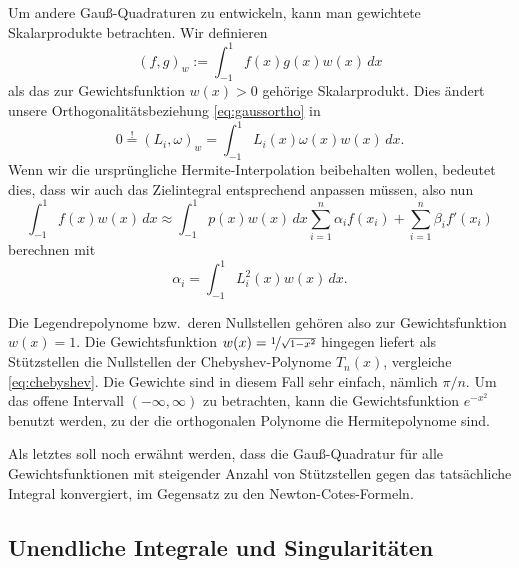 Um andere Gauß-Quadraturen zu entwickeln, kann man gewichtete
Skalarprodukte betrachten. Wir definieren
\begin{equation}
  (f,g)_w := \int_{-1}^1 f(x)g(x)w(x)\, dx
\end{equation}
als das zur Gewichtsfunktion $w(x)>0$ gehörige Skalarprodukt. Dies
ändert unsere Orthogonalitätsbeziehung \eqref{eq:gaussortho} in
\begin{equation}
  0 \stackrel{!}{=} (L_i,\omega)_w = \int_{-1}^1 L_i(x)\omega(x)w(x)\, dx.
\end{equation}
Wenn wir die ursprüngliche Hermite-Interpolation beibehalten wollen,
bedeutet dies, dass wir auch das Zielintegral entsprechend anpassen
müssen, also nun
\begin{equation}
  \int_{-1}^1 f(x) w(x)\, dx \approx \int_{-1}^1 p(x) w(x)\, dx
  \sum_{i=1}^{n} \alpha_i f(x_i) + \sum_{i=1}^{n} \beta_i f'(x_i)
\end{equation}
berechnen mit
\begin{equation}
  \alpha_i = \int_{-1}^1 L_i^2(x)w(x)\, dx.
\end{equation}

Die Legendrepolynome bzw.\ deren Nullstellen gehören also zur
Gewichtsfunktion $w(x)=1$. Die Gewichtsfunktion
$w(x)=\nicefrac{1}{\sqrt{1-x^2}}$ hingegen liefert als Stützstellen
die Nullstellen der Chebyshev-Polynome $T_n(x)$, vergleiche
\eqref{eq:chebyshev}. Die Gewichte sind in diesem Fall sehr einfach,
nämlich $\pi/n$. Um das offene Intervall $(-\infty,\infty)$ zu
betrachten, kann die Gewichtsfunktion $e^{-x^2}$ benutzt werden, zu
der die orthogonalen Polynome die Hermitepolynome sind.

Als letztes soll noch erwähnt werden, dass die Gauß-Quadratur für alle
Gewichtsfunktionen mit steigender Anzahl von Stützstellen gegen das
tatsächliche Integral konvergiert, im Gegensatz zu den
Newton-Cotes-Formeln.

\subsection{Unendliche Integrale und Singularitäten}

